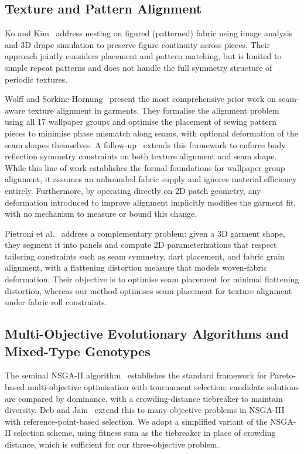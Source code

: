 \subsection{Texture and Pattern Alignment}
\label{sec:rw_texture}

Ko and Kim~\cite{Ko2013} address nesting on figured (patterned) fabric using
image analysis and 3D drape simulation to preserve figure continuity across
pieces.
Their approach jointly considers placement and pattern matching, but is
limited to simple repeat patterns and does not handle the full symmetry
structure of periodic textures.

Wolff and Sorkine-Hornung~\cite{WolffS19} present the most comprehensive
prior work on seam-aware texture alignment in garments.
They formalise the alignment problem using all 17 wallpaper groups and
optimise the placement of sewing pattern pieces to minimise phase mismatch
along seams, with optional deformation of the seam shapes themselves.
A follow-up~\cite{WolffHS19} extends this framework to enforce body
reflection symmetry constraints on both texture alignment and seam shape.
While this line of work establishes the formal foundations for wallpaper
group alignment, it assumes an unbounded fabric supply and ignores material
efficiency entirely.
Furthermore, by operating directly on 2D patch geometry, any deformation
introduced to improve alignment implicitly modifies the garment fit, with
no mechanism to measure or bound this change.

Pietroni et al.~\cite{PietroniDFLVS22} address a complementary problem:
given a 3D garment shape, they segment it into panels and compute 2D
parameterizations that respect tailoring constraints such as seam symmetry,
dart placement, and fabric grain alignment, with a flattening distortion
measure that models woven-fabric deformation.
Their objective is to optimise seam placement for minimal flattening
distortion, whereas our method optimises seam placement for texture
alignment under fabric roll constraints.

\subsection{Multi-Objective Evolutionary Algorithms and Mixed-Type Genotypes}
\label{sec:rw_moea}

The seminal NSGA-II algorithm~\cite{Deb2002NSGAII} establishes the standard
framework for Pareto-based multi-objective optimisation with tournament
selection: candidate solutions are compared by dominance, with a
crowding-distance tiebreaker to maintain diversity.
Deb and Jain~\cite{DebJ14} extend this to many-objective problems in
NSGA-III with reference-point-based selection.
We adopt a simplified variant of the NSGA-II selection scheme, using
fitness sum as the tiebreaker in place of crowding distance, which is
sufficient for our three-objective problem.

